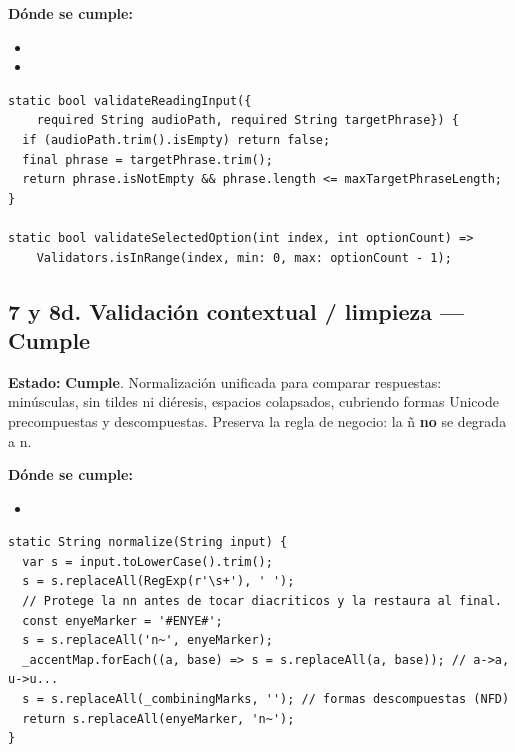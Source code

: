 \documentclass[11pt,a4paper]{article}
\newcommand{\Cumple}{\textcolor{cumpleColor}{\textbf{Cumple}}}
\begin{document}
\textbf{Dónde se cumple:}
\begin{itemize}[leftmargin=1.2cm,nosep]
\item \texttt{}
\item \texttt{}
\end{itemize}

\begin{lstlisting}[style=dartstyle,caption={Invariantes de negocio (exercise\_input\_validator.dart)}]
static bool validateReadingInput({
    required String audioPath, required String targetPhrase}) {
  if (audioPath.trim().isEmpty) return false;
  final phrase = targetPhrase.trim();
  return phrase.isNotEmpty && phrase.length <= maxTargetPhraseLength;
}

static bool validateSelectedOption(int index, int optionCount) =>
    Validators.isInRange(index, min: 0, max: optionCount - 1);
\end{lstlisting}

\subsection{7 y 8d. Validación contextual / limpieza --- \Cumple}

\textbf{Estado:} \Cumple. Normalización unificada para comparar respuestas: minúsculas, sin tildes ni diéresis, espacios colapsados, cubriendo formas Unicode precompuestas y descompuestas. Preserva la regla de negocio: la ñ \textbf{no} se degrada a n.

\textbf{Dónde se cumple:}
\begin{itemize}[leftmargin=1.2cm,nosep]
\item \texttt{}
\end{itemize}

\begin{lstlisting}[style=dartstyle,caption={Normalización de texto (contextual\_normalizer.dart)}]
static String normalize(String input) {
  var s = input.toLowerCase().trim();
  s = s.replaceAll(RegExp(r'\s+'), ' ');
  // Protege la nn antes de tocar diacriticos y la restaura al final.
  const enyeMarker = '#ENYE#';
  s = s.replaceAll('n~', enyeMarker);
  _accentMap.forEach((a, base) => s = s.replaceAll(a, base)); // a->a, u->u...
  s = s.replaceAll(_combiningMarks, ''); // formas descompuestas (NFD)
  return s.replaceAll(enyeMarker, 'n~');
}
\end{lstlisting}
\end{document}
